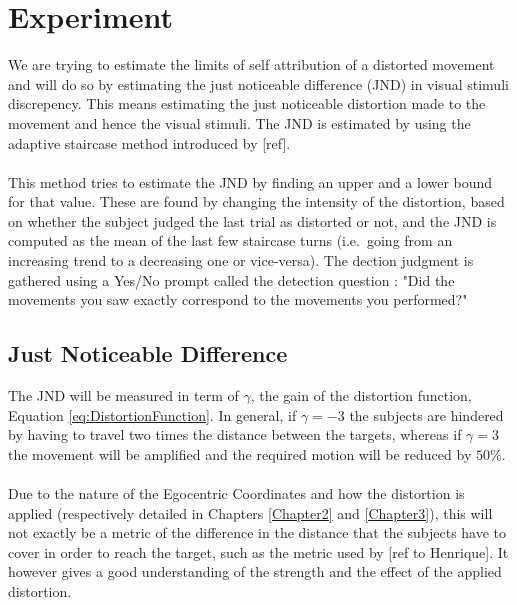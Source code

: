 
\chapter{Experiment} %

\label{Chapter4} %

We are trying to estimate the limits of self attribution of a distorted movement and will do so by estimating the just noticeable difference (JND) in visual stimuli discrepency. This means estimating the just noticeable distortion made to the movement and hence the visual stimuli. The JND is estimated by using the adaptive staircase method introduced by [ref].
\\\\
This method tries to estimate the JND by finding an upper and a lower bound for that value. These are found by changing the intensity of the distortion, based on whether the subject judged the last trial as distorted or not, and the JND is computed as the mean of the last few staircase turns (i.e.\ going from an increasing trend to a decreasing one or vice-versa). The dection judgment is gathered using a Yes/No prompt called the detection question : "Did the movements you saw exactly correspond to the movements you performed?"

\section{Just Noticeable Difference}

The JND will be measured in term of $\gamma$, the gain of the distortion function, Equation \ref{eq:DistortionFunction}. In general, if $\gamma = -3$ the subjects are hindered by having to travel two times the distance between the targets, whereas if $\gamma = 3$ the movement will be amplified and the required motion will be reduced by $50\%$.
\\\\
Due to the nature of the Egocentric Coordinates and how the distortion is applied (respectively detailed in Chapters \ref{Chapter2} and \ref{Chapter3}), this will not exactly be a metric of the difference in the distance that the subjects have to cover in order to reach the target, such as the metric used by [ref to Henrique]. It however gives a good understanding of the strength and the effect of the applied distortion.

